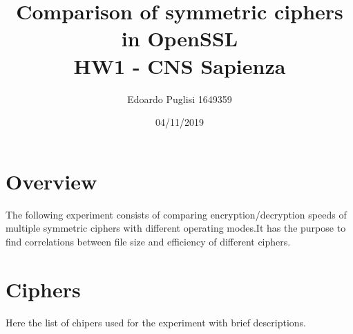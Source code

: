 \documentclass[11pt,a4paper]{article}
\title{Comparison of symmetric ciphers in OpenSSL \\ HW1 - CNS Sapienza}
\author{Edoardo Puglisi 1649359}
\date{04/11/2019}
\begin{document}
\lstset{breaklines=true}
	
\maketitle
\tableofcontents
\clearpage

\section{Overview}
The following experiment consists of comparing encryption/decryption speeds of multiple symmetric ciphers with different operating modes.It has the purpose to find correlations between file size and efficiency of different ciphers. 

\section{Ciphers}
Here the list of chipers used for the experiment with brief descriptions.
\end{document}
